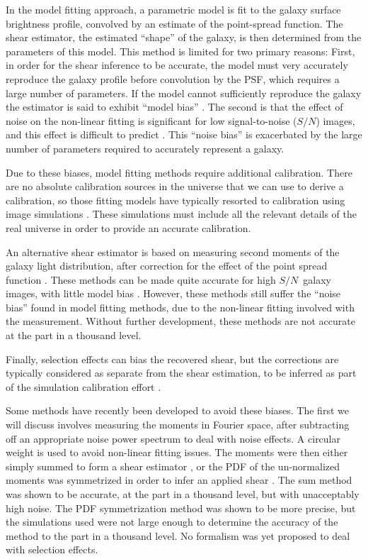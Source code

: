 \documentclass[a4paper,fleqn,usenatbib]{mnras}
\newcommand{\snr}{$S/N$}
\begin{document}
In the model fitting approach, a parametric model is fit to the galaxy surface
brightness profile, convolved by an estimate of the point-spread function.
The shear estimator, the estimated ``shape'' of the galaxy, is then determined
from the parameters of this model.  This method is limited for two primary
reasons: First, in order for the shear inference to be accurate, the model
must very accurately reproduce the galaxy profile before convolution by the
PSF, which requires a large number of parameters.  If the model
cannot sufficiently reproduce the galaxy the estimator is said to exhibit
``model bias'' \citep{Bernstein2010}.  The second is that the effect of noise
on the non-linear fitting is significant for low signal-to-noise (\snr)
images, and this effect is difficult to predict
\citep{HirataAlign04,Refreg12,Melchior12}.  This ``noise bias'' is exacerbated
by the large number of parameters required to accurately represent a galaxy.

Due to these biases, model fitting methods require additional calibration.
There are no absolute calibration sources in the universe that we can use to
derive a calibration, so those fitting models have typically resorted to
calibration using image simulations \citep[e.g.][]{Zuntz13,Miller13}.  These
simulations must include all the relevant details of the real universe in
order to provide an accurate calibration.

An alternative shear estimator is based on measuring second moments of the
galaxy light distribution, after correction for the effect of the point spread
function \citep[e.g.][]{ksb95,Bernstein2010}.  These methods can be made quite
accurate for high \snr\ galaxy images, with little model bias
\citep{Bernstein2010,Okura2016}.  However, these methods still suffer the
``noise bias'' found in model fitting methods, due to the non-linear fitting
involved with the measurement.  Without further development, these methods are
not accurate at the part in a thousand level.

Finally, selection effects can bias the recovered shear, but the corrections
are typically considered as separate from the shear estimation, to be inferred
as part of the simulation calibration effort \citep[e.g.][]{Zuntz13}.


Some methods have recently been developed to avoid these biases.  The first we
will discuss \citep{Zhang2017} involves measuring the moments in Fourier space,
after subtracting off an appropriate noise power spectrum to deal with noise
effects.  A circular weight is used to avoid non-linear fitting issues.  The
moments were then either simply summed to form a shear estimator
\citep{Zhang2015}, or the PDF of the un-normalized moments was symmetrized in
order to infer an applied shear \citep{Zhang2017}.  The sum method was shown to
be accurate, at the part in a thousand level, but with unacceptably high noise.
The PDF symmetrization method was shown to be more precise, but the simulations
used were not large enough to determine the accuracy of the method to the part
in a thousand level.  No formalism was yet proposed to deal with selection
effects. 
\end{document}
